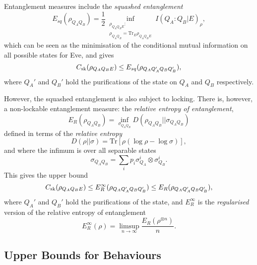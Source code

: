 \documentclass[10pt, a4paper]{article}
\numberwithin{equation}{section} %
\theoremstyle{definition}
\theoremstyle{plain}
\newcommand{\?}{\mathrel{?}} %
\newcommand{\Tr}{\mathrm{Tr}} %
\newcommand{\sk}{\rm sk}
\begin{document}
      Entanglement measures include the \emph{squashed entanglement}
      \begin{equation}
        E_{sq}(\rho_{Q_A Q_B}) = \frac{1}{2} \inf_{\substack{\rho_{Q_A Q_BE} : \\ \rho_{Q_A Q_B} = \Tr_E \rho_{Q_A Q_BE}}} I(Q_A:Q_B|E)_{\rho},
      \end{equation}
      which can be seen as the minimisation of the conditional mutual information on all possible states for Eve, and gives
      \begin{equation}
        C_{\sk}(\rho_{Q_A Q_B E}) \leq E_{sq}(\rho_{Q_A Q_A' Q_B Q_B'}),
      \end{equation}
      where \(Q_A'\) and \(Q_B'\) hold the purifications of the state on \(Q_A\) and \(Q_B\) respectively.

      However, the squashed entanglement is also subject to locking. There is, however, a non-lockable entanglement measure: the \emph{relative entropy of entanglement},  
      \begin{equation}
        E_R\left({\rho_{Q_AQ_B}}\right) = \inf_{\sigma_{Q_AQ_B}} D(\rho_{Q_AQ_B}||\sigma_{Q_AQ_B})
      \end{equation}
      defined in terms of the \emph{relative entropy}
      \begin{equation}
        D(\rho||\sigma) = \Tr\left[ \rho (\log \rho - \log \sigma) \right],
      \end{equation}
      and where the infimum is over all separable states
      \begin{equation}
        \sigma_{Q_AQ_B} = \sum_i p_i \sigma_{Q_A}^i \otimes \sigma_{Q_B}^i.
      \end{equation}
      This gives the upper bound
      \begin{equation}
        C_{\sk}(\rho_{Q_A Q_B E}) \leq E_{R}^{\infty}(\rho_{Q_A Q_A' Q_B Q_B'}) \leq E_{R}(\rho_{Q_A Q_A' Q_B Q_B'}),
      \end{equation}
      where \(Q_A'\) and \(Q_B'\) hold the purifications of the state, and \(E_{R}^{\infty}\) is the \emph{regularised} version of the relative entropy of entanglement
      \begin{equation}
        E_{R}^{\infty}(\rho) = \limsup_{n\to\infty} \frac{E_R(\rho^{\otimes n})}{n}.
      \end{equation}

      \subsection{Upper Bounds for Behaviours}
\end{document}
